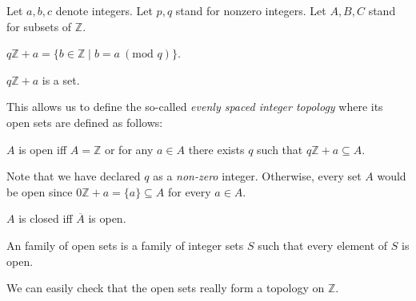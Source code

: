 \documentclass{article}
\renewcommand{\mod}{\text{mod }}
\newcommand{\Int}{\mathbb{Z}}
\begin{document}
  \begin{forthel}
    Let $a,b,c$ denote integers.
    Let $p,q$ stand for nonzero integers.
    Let $A,B,C$ stand for subsets of $\Int$.

    \begin{definition}\label{ArSeq}
      $q \Int + a = \{ b \in \Int \mid b = a ~(\mod q) \}$.
    \end{definition}

    \begin{lemma}
      $q \Int + a$ is a set.
    \end{lemma}
  \end{forthel}

  This allows us to define the so-called \textit{evenly spaced integer topology} where its open sets
  are defined as follows:

  \begin{forthel}
    \begin{definition}\label{Open}
      $A$ is open iff $A = \Int$ or for any $a \in A$ there exists $q$ such that
      $q \Int + a \subseteq A$.
    \end{definition}
  \end{forthel}

  Note that we have declared $q$ as a \textit{non-zero} integer. Otherwise, every set $A$ would be
  open since $0 \Int + a = \{ a \} \subseteq A$ for every $a \in A$.

  \begin{forthel}
    \begin{definition}\label{Closed}
      $A$ is closed iff $\overline{A}$ is open.
    \end{definition}

    \begin{definition}\label{OpenIntegerSets}
      An family of open sets is a family of integer sets $S$ such that every element of $S$ is open.
    \end{definition}
  \end{forthel}

  We can easily check that the open sets really form a topology on $\Int$.
\end{document}
